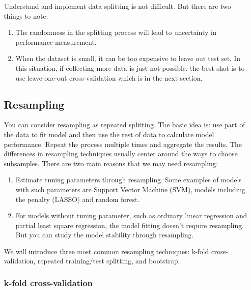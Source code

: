\documentclass[
  12pt,
]{krantz}
\providecommand{\tightlist}{%
  \setlength{\itemsep}{0pt}\setlength{\parskip}{0pt}}
\begin{document}
Understand and implement data splitting is not difficult. But there are two things to note:

\begin{enumerate}
\def\labelenumi{\arabic{enumi}.}
\tightlist
\item
  The randomness in the splitting process will lead to uncertainty in performance measurement.
\item
  When the dataset is small, it can be too expensive to leave out test set. In this situation, if collecting more data is just not possible, the best shot is to use leave-one-out cross-validation which is in the next section.
\end{enumerate}

\hypertarget{resampling}{%
\subsection{Resampling}\label{resampling}}

You can consider resampling as repeated splitting. The basic idea is: use part of the data to fit model and then use the rest of data to calculate model performance. Repeat the process multiple times and aggregate the results. The differences in resampling techniques usually center around the ways to choose subsamples. There are two main reasons that we may need resampling:

\begin{enumerate}
\def\labelenumi{\arabic{enumi}.}
\item
  Estimate tuning parameters through resampling. Some examples of models with such parameters are Support Vector Machine (SVM), models including the penalty (LASSO) and random forest.
\item
  For models without tuning parameter, such as ordinary linear regression and partial least square regression, the model fitting doesn't require resampling. But you can study the model stability through resampling.
\end{enumerate}

We will introduce three most common resampling techniques: k-fold cross-validation, repeated training/test splitting, and bootstrap.

\hypertarget{k-fold-cross-validation}{%
\subsubsection{k-fold cross-validation}\label{k-fold-cross-validation}}
\end{document}
